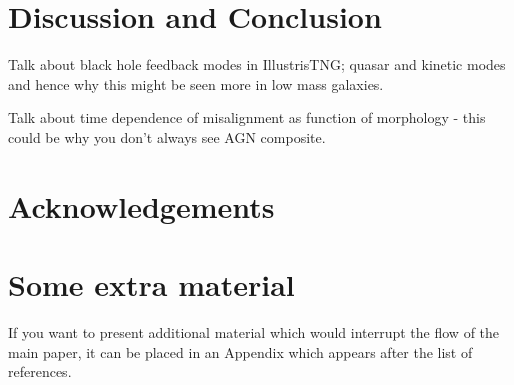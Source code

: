 \documentclass[fleqn,usenatbib]{mnras}
\begin{document}
\section{Discussion and Conclusion} \label{sec:conclusion}
Talk about black hole feedback modes in IllustrisTNG; quasar and kinetic modes and hence why this might be seen more in low mass galaxies.

Talk about time dependence of misalignment as function of morphology - this could be why you don't always see AGN composite.

\section*{Acknowledgements}






 



\appendix

\section{Some extra material}

If you want to present additional material which would interrupt the flow of the main paper,
it can be placed in an Appendix which appears after the list of references.



\bsp	%
\label{lastpage}
\end{document}
